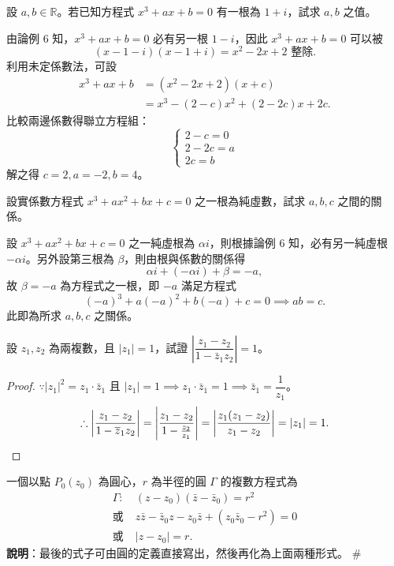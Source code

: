 \begin{example}
設 $a, b \in \mathbb{R}$。若已知方程式 $x^3+ax+b=0$ 有一根為 $1+i$，試求 $a, b$ 之值。
\end{example}

\begin{solution}
由論例 6 知，$x^3+ax+b=0$ 必有另一根 $1-i$，因此 $x^3+ax+b=0$ 可以被
\[
(x-1-i)(x-1+i) = x^2-2x+2 \text{ 整除.}
\]
利用未定係數法，可設
\begin{align*}
x^3+ax+b &= (x^2-2x+2)(x+c) \\
&= x^3-(2-c)x^2+(2-2c)x+2c.
\end{align*}
比較兩邊係數得聯立方程組：
\[
\begin{cases}
2-c = 0 \\
2-2c = a \\
2c = b
\end{cases}
\]
解之得 $c=2, a=-2, b=4$。 \qedhere
\end{solution}

\begin{example}
設實係數方程式 $x^3+ax^2+bx+c=0$ 之一根為純虛數，試求 $a, b, c$ 之間的關係。
\end{example}

\begin{solution}
設 $x^3+ax^2+bx+c=0$ 之一純虛根為 $\alpha i$，則根據論例 6 知，必有另一純虛根 $-\alpha i$。另外設第三根為 $\beta$，則由根與係數的關係得
\[
\alpha i + (-\alpha i) + \beta = -a,
\]
故 $\beta = -a$ 為方程式之一根，即 $-a$ 滿足方程式
\[
(-a)^3+a(-a)^2+b(-a)+c = 0 \implies ab=c.
\]
此即為所求 $a, b, c$ 之關係。 \qedhere
\end{solution}

\begin{example}
設 $z_1, z_2$ 為兩複數，且 $|z_1|=1$，試證 $\left|\dfrac{z_1-z_2}{1-\bar{z}_1 z_2}\right| = 1$。
\end{example}

\begin{proof}
$\because |z_1|^2 = z_1\cdot\bar{z}_1$ 且 $|z_1|=1 \implies z_1\cdot\bar{z}_1 = 1 \implies \bar{z}_1 = \dfrac{1}{z_1}$。
\[
\therefore \left|\frac{z_1-z_2}{1-\bar{z}_1 z_2}\right| = \left|\frac{z_1-z_2}{1-\frac{z_2}{z_1}}\right| = \left|\frac{z_1(z_1-z_2)}{z_1-z_2}\right| = |z_1| = 1. \qedhere
\]
\end{proof}

\begin{discussion}
一個以點 $P_0(z_0)$ 為圓心，$r$ 為半徑的圓 $\Gamma$ 的複數方程式為
\begin{align*}
\Gamma: &\ (z-z_0)(\bar{z}-\bar{z}_0) = r^2 \\
\text{或} &\ z\bar{z}-\bar{z}_0 z - z_0\bar{z} + (z_0\bar{z}_0-r^2) = 0 \\
\text{或} &\ |z-z_0| = r.
\end{align*}
\textbf{說明}：最後的式子可由圓的定義直接寫出，然後再化為上面兩種形式。 \hfill\#
\end{discussion}

